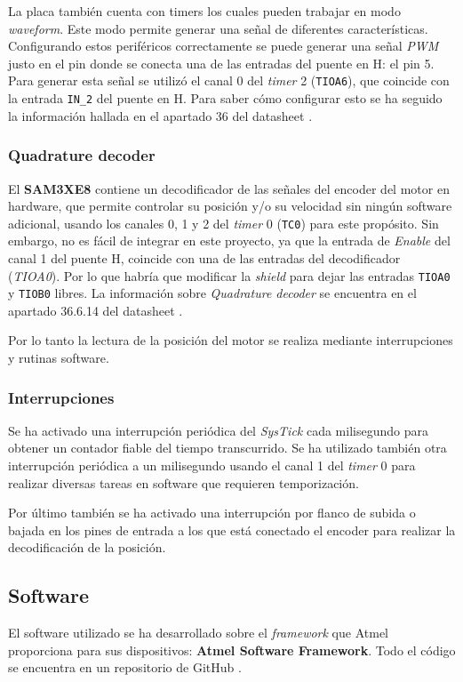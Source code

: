 \documentclass[a4paper]{article}
\begin{document}
La placa también cuenta con timers los cuales pueden trabajar en modo \emph{waveform}.
Este modo permite generar una señal de diferentes características.
Configurando estos periféricos correctamente se puede generar una señal \emph{PWM} justo en el pin donde se conecta una de las entradas del puente en H: el pin 5.
Para generar esta señal se utilizó el canal 0 del \emph{timer} 2 (\texttt{TIOA6}), que coincide con la entrada \texttt{IN\_2} del puente en H. Para saber cómo configurar esto
se ha seguido la información hallada en el apartado 36 del datasheet \cite{SAM3X/A}.

\subsubsection{Quadrature decoder}
El \textbf{SAM3XE8} contiene un decodificador de las señales del encoder del motor en hardware,
que permite controlar su posición y/o su velocidad sin ningún software adicional, usando los canales 0, 1 y 2 del \emph{timer} 0 (\texttt{TC0}) para este propósito.
Sin embargo, no es fácil de integrar en este proyecto, ya que la entrada de \emph{Enable} del canal 1 del puente H, coincide con una de las entradas del decodificador (\emph{TIOA0}).
Por lo que habría que modificar la \emph{shield} para dejar las entradas \texttt{TIOA0} y \texttt{TIOB0} libres. La información sobre \emph{Quadrature decoder} se encuentra en el apartado
36.6.14 del datasheet \cite{SAM3X/A}.

Por lo tanto la lectura de la posición del motor se realiza mediante interrupciones y rutinas software.

\subsubsection{Interrupciones \label{int}}
Se ha activado una interrupción periódica del \emph{SysTick} cada milisegundo para obtener un contador fiable del tiempo transcurrido.
Se ha utilizado también otra interrupción periódica a un milisegundo usando el canal 1 del \emph{timer} 0 para realizar diversas tareas en software que requieren temporización.

Por último también se ha activado una interrupción por flanco de subida o bajada en los pines de entrada a los que está conectado el encoder para realizar la decodificación de la posición.

\subsection{Software \label{sec:software}}
El software utilizado se ha desarrollado sobre el \emph{framework} \cite{framework} que Atmel proporciona para sus dispositivos: \textbf{Atmel Software Framework}.
Todo el código se encuentra en un repositorio de GitHub \cite{git}.
\end{document}
